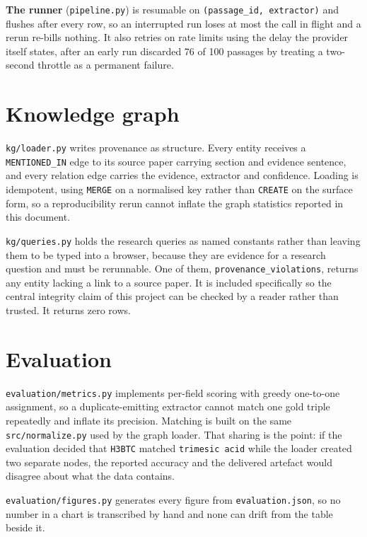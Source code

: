 \documentclass[11pt,a4paper,oneside]{report}
\begin{document}
\textbf{The runner} (\texttt{pipeline.\allowbreak{}py}) is resumable on \texttt{(passage\_\allowbreak{}id, extractor)} and flushes after every row, so an interrupted run loses at most the call in flight and a rerun re-bills nothing. It also retries on rate limits using the delay the provider itself states, after an early run discarded 76 of 100 passages by treating a two-second throttle as a permanent failure.

\section{Knowledge graph}

\texttt{kg/\allowbreak{}loader.\allowbreak{}py} writes provenance as structure. Every entity receives a \texttt{MENTIONED\_\allowbreak{}IN} edge to its source paper carrying section and evidence sentence, and every relation edge carries the evidence, extractor and confidence. Loading is idempotent, using \texttt{MERGE} on a normalised key rather than \texttt{CREATE} on the surface form, so a reproducibility rerun cannot inflate the graph statistics reported in this document.

\texttt{kg/\allowbreak{}queries.\allowbreak{}py} holds the research queries as named constants rather than leaving them to be typed into a browser, because they are evidence for a research question and must be rerunnable. One of them, \texttt{provenance\_\allowbreak{}violations}, returns any entity lacking a link to a source paper. It is included specifically so the central integrity claim of this project can be checked by a reader rather than trusted. It returns zero rows.

\section{Evaluation}

\texttt{evaluation/\allowbreak{}metrics.\allowbreak{}py} implements per-field scoring with greedy one-to-one assignment, so a duplicate-emitting extractor cannot match one gold triple repeatedly and inflate its precision. Matching is built on the same \texttt{src/\allowbreak{}normalize.\allowbreak{}py} used by the graph loader. That sharing is the point: if the evaluation decided that \texttt{H3BTC} matched \texttt{trimesic acid} while the loader created two separate nodes, the reported accuracy and the delivered artefact would disagree about what the data contains.

\texttt{evaluation/\allowbreak{}figures.\allowbreak{}py} generates every figure from \texttt{evaluation.\allowbreak{}json}, so no number in a chart is transcribed by hand and none can drift from the table beside it.
\end{document}

